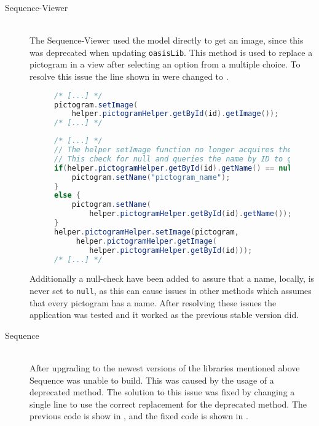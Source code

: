 \begin{description} 
    \item[Sequence-Viewer] \hfill \\ 
    The Sequence-Viewer used the model directly to get an image, since this was deprecated when updating \texttt{oasisLib}. 
    This method is used to replace a pictogram in a view after selecting an option from a multiple choice. 
     To resolve this issue the line shown in  were changed to . 
     \begin{figure} 
        \begin{lstlisting}[language=java, caption={Sequence-Viewer with deprecated method call. }, label=lst:dep-sv-prev] 
/* [...] */ 
pictogram.setImage( 
    helper.pictogramHelper.getById(id).getImage()); 
/* [...] */ 
        \end{lstlisting} 
    \end{figure} 
    \begin{figure} 
        \begin{lstlisting}[language=java, caption={Sequence-Viewer replacement code. }, label=lst:dep-sv-upd] 
/* [...] */ 
// The helper setImage function no longer acquires the pictogram name and causes null exception error 
// This check for null and queries the name by ID to get name 
if(helper.pictogramHelper.getById(id).getName() == null) { 
    pictogram.setName("pictogram_name"); 
} 
else { 
    pictogram.setName( 
        helper.pictogramHelper.getById(id).getName()); 
} 
helper.pictogramHelper.setImage(pictogram, 
     helper.pictogramHelper.getImage( 
        helper.pictogramHelper.getById(id))); 
/* [...] */ 
        \end{lstlisting} 
    \end{figure} 
    Additionally a null-check have been added to assure that a name, locally, is never set to \texttt{null}, as this can cause issues in other methods which assumes that every pictogram has a name. 
     After resolving these issues the application was tested and it worked as the previous stable version did. 
     \item[Sequence] \hfill \\ 
    After upgrading to the newest versions of the libraries mentioned above Sequence was unable to build. 
     This was caused by the usage of a deprecated method. 
     The solution to this issue was fixed by changing a single line to use the correct replacement for the deprecated method. 
    The previous code is show in , and the fixed code is shown in . 

\end{description}
